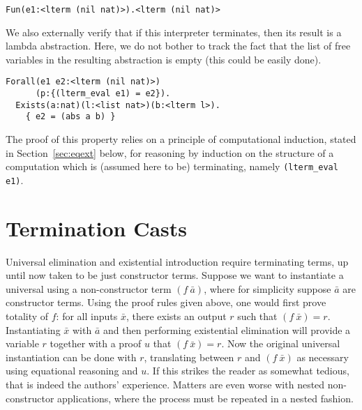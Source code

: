 \documentclass[preprint,natbib]{sigplanconf}
\begin{document}
\begin{verbatim}
Fun(e1:<lterm (nil nat)>).<lterm (nil nat)> 
\end{verbatim}

We also externally verify that if this interpreter terminates, then
its result is a lambda abstraction.  Here, we do not bother to track
the fact that the list of free variables in the resulting abstraction
is empty (this could be easily done).

\begin{verbatim}
Forall(e1 e2:<lterm (nil nat)>)
      (p:{(lterm_eval e1) = e2}).
  Exists(a:nat)(l:<list nat>)(b:<lterm l>).
    { e2 = (abs a b) }
\end{verbatim}

\noindent The proof of this property relies on a principle of
computational induction, stated in Section~\ref{sec:eqext} below, for
reasoning by induction on the structure of a computation which is
(assumed here to be) terminating, namely \texttt{(lterm\_eval e1)}.

\section{Termination Casts}
\label{sec:terminates}

Universal elimination and existential introduction require terminating
terms, up until now taken to be just constructor terms.  Suppose we
want to instantiate a universal using a non-constructor term $(f\
\bar{a})$, where for simplicity suppose $\bar{a}$ are constructor
terms.  Using the proof rules given above, one would first prove
totality of $f$: for all inputs $\bar{x}$, there exists an output $r$
such that $(f\ \bar{x}) = r$.  Instantiating $\bar{x}$ with $\bar{a}$
and then performing existential elimination will provide a variable
$r$ together with a proof $u$ that $(f\ \bar{x}) = r$.  Now the
original universal instantiation can be done with $r$, translating
between $r$ and $(f\ \bar{x})$ as necessary using equational reasoning
and $u$.  If this strikes the reader as somewhat tedious, that is
indeed the authors' experience.  Matters are even worse with nested
non-constructor applications, where the process must be repeated in a
nested fashion.
\end{document}
